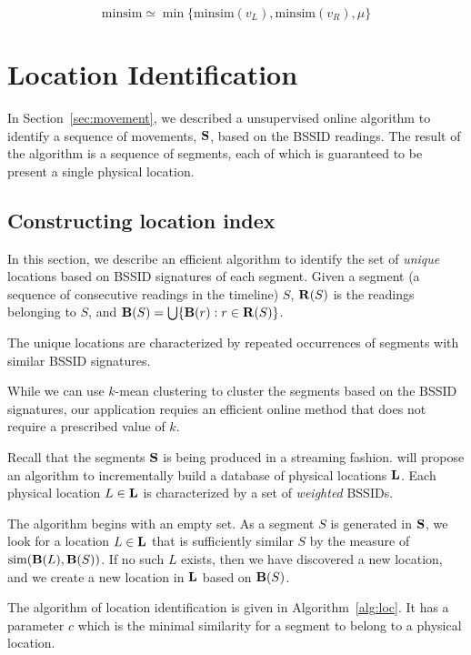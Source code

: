 $$\mathrm{minsim} \simeq \min\{\mathrm{minsim}(v_L), \mathrm{minsim}(v_R), \mu\}$$

\section{Location Identification}

\label{sec:loc}

In Section~\ref{sec:movement}, we described a unsupervised online algorithm to
identify a sequence of movements, $\mathbf{S}$, based on the BSSID readings.  The result of the
algorithm is a sequence of segments, each of which is guaranteed to be present a
single physical location.

\subsection{Constructing location index}

In this section, we describe an efficient algorithm to identify the set of {\em
unique} locations based on BSSID signatures of each segment.  Given a segment (a
sequence of consecutive readings in the timeline) $S$, $\mathbf{R}(S)$ is the readings
belonging to $S$, and $\mathbf{B}(S) = \bigcup\{\mathbf{B}(r): r\in\mathbf{R}(S)\}$.

The unique locations are characterized by repeated occurrences of segments with
similar BSSID signatures.

While we can use $k$-mean clustering to cluster the segments based on the BSSID
signatures, our application requies an efficient online method that does not
require a prescribed value of $k$.

Recall that the segments $\mathbf{S}$ is being produced in a streaming fashion.  will
propose an algorithm to incrementally build a database of physical locations
$\mathbf{L}$.  Each physical location $L\in\mathbf{L}$ is characterized by a set of {\em
weighted} BSSIDs.

The algorithm begins with an empty set.  As a segment $S$ is generated in $\mathbf{S}$, we
look for a location $L\in\mathbf{L}$ that is sufficiently similar $S$ by the measure
of $\mathrm{sim}(\mathbf{B}(L), \mathbf{B}(S))$.  If no such $L$ exists, then we have
discovered a new location, and we create a new location in $\mathbf{L}$ based on $\mathbf{B}(S)$.

The algorithm of location identification is given in Algorithm~\ref{alg:loc}.
It has a parameter $c$ which is the minimal similarity for a segment to belong
to a physical location.

